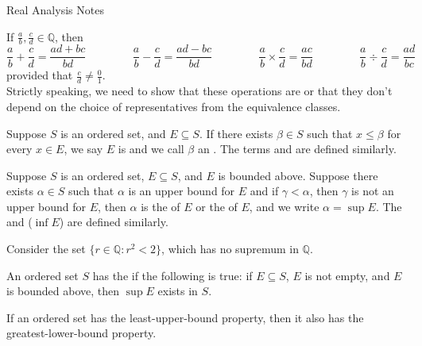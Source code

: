 \documentclass[11pt,letterpaper]{jacky}
\newcommand{\Qq}{\mathbb{Q}}
\begin{document}
\begin{center}
  \vspace*{20pt}
  \LARGE{Real Analysis Notes}
\end{center}

If $\frac{a}{b},\frac{c}{d}\in\Qq$, then
$$\frac{a}{b}+\frac{c}{d}=\frac{ad+bc}{bd} \hspace{50pt}
\frac{a}{b}-\frac{c}{d}=\frac{ad-bc}{bd} \hspace{50pt}
\frac{a}{b}\times\frac{c}{d}=\frac{ac}{bd} \hspace{50pt}
\frac{a}{b}\div\frac{c}{d}=\frac{ad}{bc}$$
provided that $\frac{c}{d}\neq\frac{0}{1}$.\\

Strictly speaking, we need to show that these operations are
 or that they don't depend on the choice of
representatives from the equivalence classes.

\begin{defi}
  Suppose $S$ is an ordered set, and $E\subseteq S$. If there exists $\beta\in
  S$ such that $x\leq \beta$ for every $x\in E$, we say $E$ is  and we call $\beta$ an . The terms  and  are defined similarly.
\end{defi}

\begin{defi}
  Suppose $S$ is an ordered set, $E\subseteq S$, and $E$ is bounded above.
  Suppose there exists $\alpha\in S$ such that $\alpha$ is an upper bound for
  $E$ and if $\gamma<\alpha$, then $\gamma$ is not an upper bound for $E$, then
  $\alpha$ is the  of $E$ or the  of
  $E$, and we write $\alpha=\sup{E}$. The  and
   ($\inf{E}$) are defined similarly.
\end{defi}

\begin{ex}
  Consider the set $\{r\in\Qq:r^2<2\}$, which has no supremum in $\Qq$.
\end{ex}

\begin{defi}
  An ordered set $S$ has the  if the
  following is true: if $E\subseteq S$, $E$ is not empty, and $E$ is bounded
  above, then $\sup{E}$ exists in $S$.
\end{defi}

If an ordered set has the least-upper-bound property, then it also has the
greatest-lower-bound property.
\end{document}
